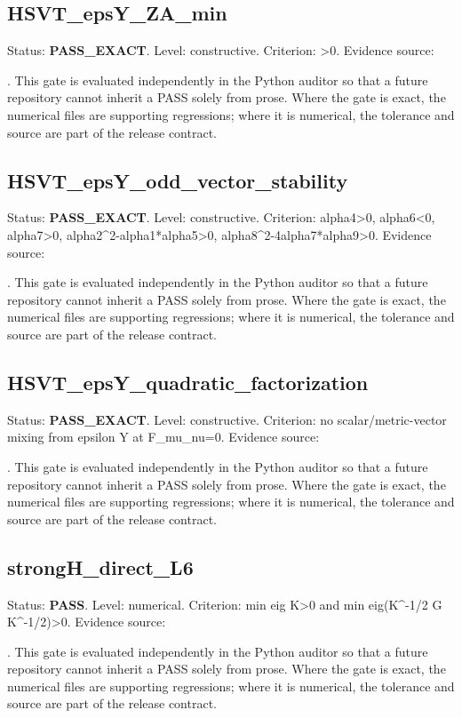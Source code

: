 \documentclass[11pt,a4paper,oneside]{book}
\begin{document}
\subsection{HSVT\_epsY\_ZA\_min}
Status: \textbf{PASS\_EXACT}. Level: constructive. Criterion: >0. Evidence source:\par\noindent{}. This gate is evaluated independently in the Python auditor so that a future repository cannot inherit a PASS solely from prose. Where the gate is exact, the numerical files are supporting regressions; where it is numerical, the tolerance and source are part of the release contract.\par

\subsection{HSVT\_epsY\_odd\_vector\_stability}
Status: \textbf{PASS\_EXACT}. Level: constructive. Criterion: alpha4>0, alpha6<0, alpha7>0, alpha2\textasciicircum{}2-alpha1*alpha5>0, alpha8\textasciicircum{}2-4alpha7*alpha9>0. Evidence source:\par\noindent{}. This gate is evaluated independently in the Python auditor so that a future repository cannot inherit a PASS solely from prose. Where the gate is exact, the numerical files are supporting regressions; where it is numerical, the tolerance and source are part of the release contract.\par

\subsection{HSVT\_epsY\_quadratic\_factorization}
Status: \textbf{PASS\_EXACT}. Level: constructive. Criterion: no scalar/metric-vector mixing from epsilon Y at F\_mu\_nu=0. Evidence source:\par\noindent{}. This gate is evaluated independently in the Python auditor so that a future repository cannot inherit a PASS solely from prose. Where the gate is exact, the numerical files are supporting regressions; where it is numerical, the tolerance and source are part of the release contract.\par

\subsection{strongH\_direct\_L6}
Status: \textbf{PASS}. Level: numerical. Criterion: min eig K>0 and min eig(K\textasciicircum{}-1/2 G K\textasciicircum{}-1/2)>0. Evidence source:\par\noindent{}. This gate is evaluated independently in the Python auditor so that a future repository cannot inherit a PASS solely from prose. Where the gate is exact, the numerical files are supporting regressions; where it is numerical, the tolerance and source are part of the release contract.\par
\end{document}
